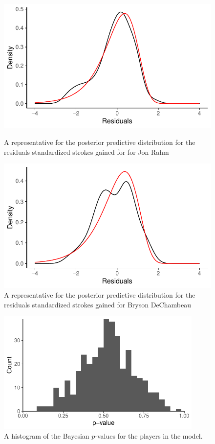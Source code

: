 \documentclass{article}\usepackage[]{graphicx}\usepackage[]{color}
\begin{document}
\begin{figure}[h]
\begin{minipage}{0.475\textwidth}
    \centering
    \includegraphics[width=1\textwidth]{Figures/posterior_predictive_rahm.pdf}
    \caption{A representative for the posterior predictive distribution for the residuals standardized strokes gained for for Jon Rahm}
    \label{fig:rahm_posterior_predictive}
\end{minipage}
\hspace{0.05\textwidth}
\begin{minipage}{0.475\textwidth}
    \centering
    \includegraphics[width=1\textwidth]{Figures/posterior_predictive_dechambeau.pdf}
    \caption{A representative for the posterior predictive distribution for the residuals standardized strokes gained for Bryson DeChambeau}
    \label{fig:dechambeau_posterior_predictive}
\end{minipage}
\end{figure}
\begin{figure}
    \centering
    \includegraphics[width=4in]{Figures/p_values.pdf}
    \caption{A histogram of the Bayesian $p$-values for the players in the model.}
    \label{fig:p_values}
\end{figure}
\end{document}
